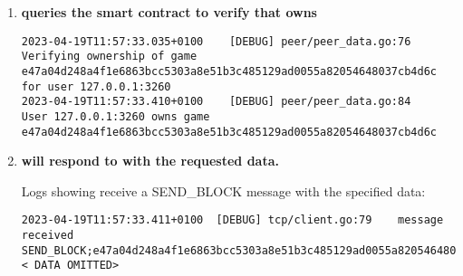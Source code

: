\begin{enumerate}[itemsep=2.5pt]
  Logs showing  choose a block and send a request for it :

\begin{lstlisting}[breaklines=true, postbreak=\mbox{\textcolor{red}{$\hookrightarrow$}\space}]
2023-04-19T11:57:33.035+0100	[DEBUG]	games/download.go:339	Requesting file downloads\User WT-1.0\test.txt for game e47a04d248a4f1e6863bcc5303a8e51b3c485129ad0055a82054648037cb4d6c
2023-04-19T11:57:33.035+0100	[DEBUG]	games/download.go:343	Requesting shard 8ad06d76f6ac8729ab24e81b5e8d273c33bd6914f40c6709f2e6c02534428923 for file downloads\User WT-1.0\test.txt in game e47a04d248a4f1e6863bcc5303a8e51b3c485129ad0055a82054648037cb4d6c
...
2023-04-19T11:57:33.035+0100	[DEBUG]	peer/requests.go:17	Processing request for block 8ad06d76f6ac8729ab24e81b5e8d273c33bd6914f40c6709f2e6c02534428923
...
2023-04-19T11:57:33.035+0100	[DEBUG]	tcp/client.go:93	Sending BLOCK;e47a04d248a4f1e6863bcc5303a8e51b3c485129ad0055a82054648037cb4d6c;8ad06d76f6ac8729ab24e81b5e8d273c33bd6914f40c6709f2e6c02534428923
\end{lstlisting}

  \item\textbf{ queries the smart contract to verify that  owns }

\begin{lstlisting}[breaklines=true, postbreak=\mbox{\textcolor{red}{$\hookrightarrow$}\space}]
2023-04-19T11:57:33.035+0100	[DEBUG]	peer/peer_data.go:76	Verifying ownership of game e47a04d248a4f1e6863bcc5303a8e51b3c485129ad0055a82054648037cb4d6c for user 127.0.0.1:3260
2023-04-19T11:57:33.410+0100	[DEBUG]	peer/peer_data.go:84	User 127.0.0.1:3260 owns game e47a04d248a4f1e6863bcc5303a8e51b3c485129ad0055a82054648037cb4d6c
\end{lstlisting}

  \item \textbf{ will respond to  with the requested data.}
  
  Logs showing  receive a SEND\_BLOCK message with the specified data:

\begin{lstlisting}[breaklines=true, postbreak=\mbox{\textcolor{red}{$\hookrightarrow$}\space}]
  2023-04-19T11:57:33.411+0100	[DEBUG]	tcp/client.go:79	message received SEND_BLOCK;e47a04d248a4f1e6863bcc5303a8e51b3c485129ad0055a82054648037cb4d6c;8ad06d76f6ac8729ab24e81b5e8d273c33bd6914f40c6709f2e6c02534428923;< DATA OMITTED>
\end{lstlisting}


\end{enumerate}
